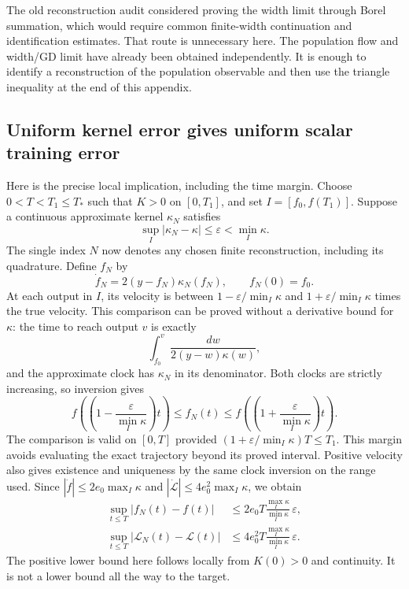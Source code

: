 The old reconstruction audit considered proving the width limit through
Borel summation, which would require common finite-width continuation and
identification estimates.  That route is unnecessary here.  The population
flow and width/GD limit have already been obtained independently.  It is
enough to identify a reconstruction of the population observable and then
use the triangle inequality at the end of this appendix.

\subsection{Uniform kernel error gives uniform scalar training error}
\label{app:borel-scalar-error}

Here is the precise local implication, including the time margin.  Choose
$0<T<T_1\le T_*$ such that $K>0$ on $[0,T_1]$, and set
$I=[f_0,f(T_1)]$.  Suppose a continuous approximate kernel $\kappa_N$ satisfies
\[
 \sup_I|\kappa_N-\kappa|\le\varepsilon<\min_I\kappa.
\]
The single index $N$ now denotes any chosen finite reconstruction, including
its quadrature.  Define $f_N$ by
\[
 \dot f_N=2(y-f_N)\kappa_N(f_N),\qquad f_N(0)=f_0.
\]
At each output in $I$, its velocity is between
$1-\varepsilon/\min_I\kappa$ and $1+\varepsilon/\min_I\kappa$ times the
true velocity.  This comparison can be proved without a derivative bound
for $\kappa$: the time to reach output $v$ is exactly
\[
 \int_{f_0}^{v}\frac{dw}{2(y-w)\kappa(w)},
\]
and the approximate clock has $\kappa_N$ in its denominator.  Both clocks
are strictly increasing, so inversion gives
\[
 f\!\left(\left(1-\frac{\varepsilon}{\min_I\kappa}\right)t\right)
 \le f_N(t)\le
 f\!\left(\left(1+\frac{\varepsilon}{\min_I\kappa}\right)t\right).
\]
The comparison is valid on $[0,T]$ provided
$(1+\varepsilon/\min_I\kappa)T\le T_1$.  This margin avoids evaluating the
exact trajectory beyond its proved interval.  Positive velocity also gives
existence and uniqueness by the same clock inversion on the range used.
Since $|\dot f|\le2e_0\max_I\kappa$ and
$|\dot{\mathcal L}|\le4e_0^2\max_I\kappa$, we obtain
\begin{align*}
 \sup_{t\le T}|f_N(t)-f(t)|
 &\le 2e_0T\frac{\max_I\kappa}{\min_I\kappa}\,\varepsilon,\\
 \sup_{t\le T}|\mathcal L_N(t)-\mathcal L(t)|
 &\le 4e_0^2T\frac{\max_I\kappa}{\min_I\kappa}\,\varepsilon.
\end{align*}
The positive lower bound here follows locally from $K(0)>0$ and continuity.
It is not a lower bound all the way to the target.

